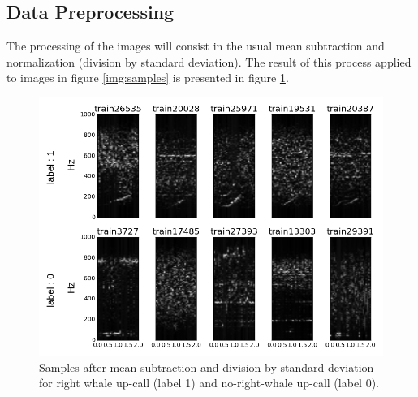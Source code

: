 \documentclass[]{article}
\begin{document}
\subsection{Data Preprocessing}\label{data-preprocessing}

The processing of the images will consist in the usual mean subtraction and normalization (division by standard deviation). The result of this process applied to images in figure \ref{img:samples} is presented in figure \ref{img:samples_unprocessed}. 

\begin{figure}[htpb!]
\centering
\includegraphics[width= \textwidth]{./images/2_samples_unprocessed}
\caption{ Samples after mean subtraction and division by standard deviation for right whale up-call (label 1) and no-right-whale up-call (label 0).  \label{img:samples_unprocessed}}
\end{figure} 
\end{document}
